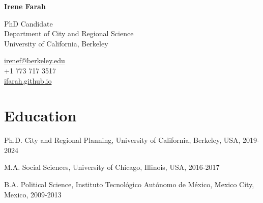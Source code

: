 \documentclass[12pt,letterpaper]{report}
\newcommand{\myname}{Irene Farah}
\newcommand{\namefont}[1]{{\normalfont\bfseries\Huge{#1}}}
\begin{document}
    \raggedright{}

    \namefont{\myname}

    \vspace{1em}
    \begin{minipage}[t]{0.700\textwidth}
        PhD Candidate \\
        Department of City and Regional Science \\
        University of California, Berkeley
    \end{minipage}
    \begin{minipage}[t]{0.295\textwidth}
        \flushright{}
        \href{mailto:irenef@berkeley.edu}{irenef@berkeley.edu} \\
        +1 773 717 3517 \\
        \href{https://ifarah.github.io}{ifarah.github.io}\\
    \end{minipage}

    \section*{Education}
    
    \begin{tablist}
      \item[Ph.D.] \tab{}City and Regional Planning, University of California, Berkeley, USA, 2019-2024 \\
      \item[M.A.] \tab{}Social Sciences, University of Chicago, Illinois, USA, 2016-2017
      \item[B.A.] \tab{}Political Science, Instituto Tecnológico Autónomo de México, Mexico City, Mexico, 2009-2013
    \end{tablist}
    
\end{document}
